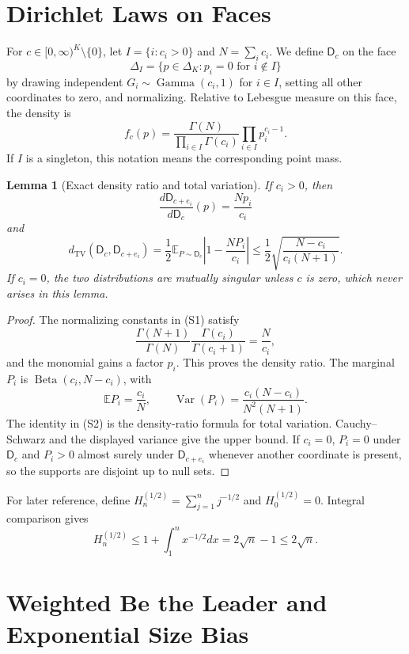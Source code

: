 \documentclass[twoside]{article}
\newtheorem{lemma}[theorem]{Lemma}
\newcommand{\E}{\mathbb E}
\newcommand{\D}{\mathsf D}
\newcommand{\TV}{d_{\mathrm{TV}}}
\begin{document}
\runningauthor{}
\onecolumn
{}
\setcounter{section}{0}
\renewcommand{\thesection}{S\arabic{section}}

\section{Dirichlet Laws on Faces}

For $c\in[0,\infty)^K\setminus\{0\}$, let $I=\{i:c_i>0\}$ and $N=\sum_ic_i$. We define $\D_c$ on the face
\[
\Delta_I=\{p\in\Delta_K:p_i=0\text{ for }i\notin I\}
\]
by drawing independent $G_i\sim\operatorname{Gamma}(c_i,1)$ for $i\in I$, setting all other coordinates to zero, and normalizing. Relative to Lebesgue measure on this face, the density is
\[
f_c(p)=\frac{\Gamma(N)}{\prod_{i\in I}\Gamma(c_i)}\prod_{i\in I}p_i^{c_i-1}.
\tag{S1}
\]
If $I$ is a singleton, this notation means the corresponding point mass.

\begin{lemma}[Exact density ratio and total variation]
\label{lem:face-tv}
If $c_i>0$, then
\[
\frac{d\D_{c+e_i}}{d\D_c}(p)=\frac{Np_i}{c_i}
\]
and
\[
\TV(\D_c,\D_{c+e_i})
=\frac12\E_{P\sim\D_c}\left|1-\frac{NP_i}{c_i}\right|
\leq\frac12\sqrt{\frac{N-c_i}{c_i(N+1)}}.
\tag{S2}
\]
If $c_i=0$, the two distributions are mutually singular unless $c$ is zero, which never arises in this lemma.
\end{lemma}

\begin{proof}
The normalizing constants in (S1) satisfy
\[
\frac{\Gamma(N+1)}{\Gamma(N)}\frac{\Gamma(c_i)}{\Gamma(c_i+1)}=\frac{N}{c_i},
\]
and the monomial gains a factor $p_i$. This proves the density ratio. The marginal $P_i$ is $\operatorname{Beta}(c_i,N-c_i)$, with
\[
\E P_i=\frac{c_i}{N},\qquad
\operatorname{Var}(P_i)=\frac{c_i(N-c_i)}{N^2(N+1)}.
\]
The identity in (S2) is the density-ratio formula for total variation. Cauchy--Schwarz and the displayed variance give the upper bound. If $c_i=0$, $P_i=0$ under $\D_c$ and $P_i>0$ almost surely under $\D_{c+e_i}$ whenever another coordinate is present, so the supports are disjoint up to null sets.
\end{proof}

For later reference, define $H_n^{(1/2)}=\sum_{j=1}^nj^{-1/2}$ and $H_0^{(1/2)}=0$. Integral comparison gives
\[
H_n^{(1/2)}\leq1+\int_1^nx^{-1/2}dx=2\sqrt n-1\leq2\sqrt n.
\tag{S3}
\]

\section{Weighted Be the Leader and Exponential Size Bias}
\end{document}
